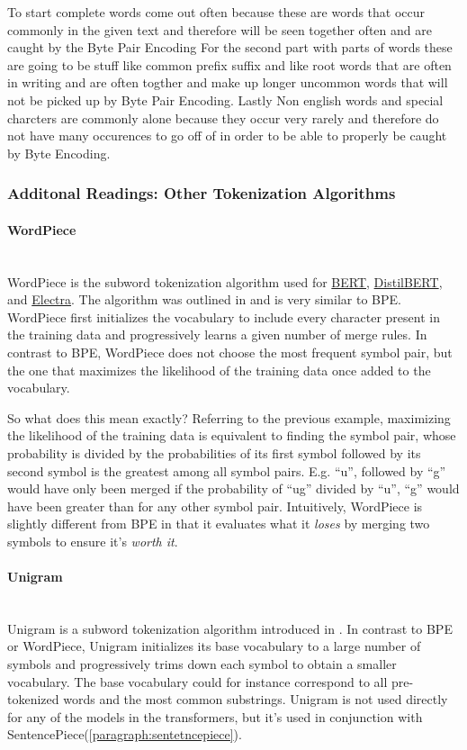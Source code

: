 To start complete words come out often because these are words that occur commonly in the given text and therefore will be seen together often and are caught by the Byte Pair Encoding
For the second part with parts of words these are going to be stuff like common prefix suffix and like root words that are often in writing and are often togther and make up longer
uncommon words that will not be picked up by Byte Pair Encoding. Lastly Non english words and special charcters are commonly alone because they occur very rarely and therefore do not 
have many occurences to go off of in order to be able to properly be caught by Byte Encoding.

\subsubsection{Additonal Readings: Other Tokenization Algorithms}
\paragraph{WordPiece}\mbox{}\\
WordPiece is the subword tokenization algorithm used for \href{https://huggingface.co/docs/transformers/main/en/model_doc/bert}{BERT}, \href{https://huggingface.co/docs/transformers/main/en/model_doc/distilbert}{DistilBERT}, and \href{https://huggingface.co/docs/transformers/main/en/model_doc/electra}{Electra}. The algorithm was outlined in \citep{Schuster2012JapaneseAK} and is very similar to
BPE. WordPiece first initializes the vocabulary to include every character present in the training data and progressively learns a given number of merge rules. In contrast to BPE, WordPiece does not choose the most frequent symbol pair, but the one that maximizes the likelihood of the training data once added to the vocabulary.

So what does this mean exactly? Referring to the previous example, maximizing the likelihood of the training data is equivalent to finding the symbol pair, whose probability is divided by the probabilities of its first symbol followed by its second symbol is the greatest among all symbol pairs. E.g. ``u'', followed by ``g'' would have only been merged if the probability of ``ug'' divided by ``u'', ``g'' would have been greater than for any other symbol pair. Intuitively, WordPiece is slightly different from BPE in that it evaluates what it \textit{loses} by merging two symbols to ensure it's \textit{worth it}.

\paragraph{Unigram}\mbox{}\\
Unigram is a subword tokenization algorithm introduced in \citep{kudo2018subword}. In contrast to BPE or WordPiece, Unigram initializes its base vocabulary to a large number of symbols and progressively trims down each symbol to obtain a smaller vocabulary. The base vocabulary could for instance correspond to all pre-tokenized words and the most common substrings. Unigram is not used directly for any of the models in the transformers, but it's used in conjunction with SentencePiece(\autoref{paragraph:sentetncepiece}).

